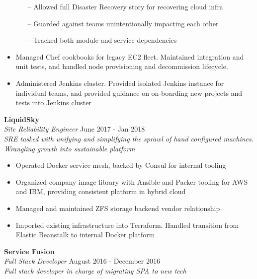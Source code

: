 \begin{itemize}
    \begin{itemize}
      \item[--] Allowed full Disaster Recovery story for recovering cloud infra
      \item[--] Guarded against teams unintentionally impacting each other
      \item[--] Tracked both module and service dependencies
    \end{itemize}
  \item Managed Chef cookbooks for legacy EC2 fleet. Maintained integration and unit tests, and handled node provisioning and decommission lifecycle.
  \item Administered Jenkins cluster. Provided isolated Jenkins instance for individual teams, and provided guidance on on-boarding new projects and tests into Jenkins cluster
\end{itemize}

\begin{minipage}{\textwidth}
  \large{\textbf{LiquidSky}} \\
  \textit{Site Reliability Engineer} \hfill June 2017 - Jan 2018 \\[3.75pt]
  \textit{SRE tasked with unifying and simplifying the sprawl of hand configured machines. Wrangling growth into sustainable platform}
\end{minipage}

\begin{itemize}
  \item Operated Docker service mesh, backed by Consul for internal tooling
  \item Organized company image library with Ansible and Packer tooling for AWS and IBM, providing consistent platform in hybrid cloud
  \item Managed and maintained ZFS storage backend vendor relationship
  \item Imported existing infrastructure into Terraform. Handled transition from Elastic Beanstalk to internal Docker platform
\end{itemize}

\begin{minipage}{\textwidth}
  \large{\textbf{Service Fusion}} \\
  \textit{Full Stack Developer} \hfill August 2016 - December 2016 \\[3.75pt]
  \textit{Full stack developer in charge of migrating SPA to new tech}
\end{minipage}

